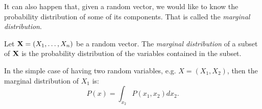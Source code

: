 It can also happen that, given a random vector, we would like to know the probability distribution of some of its components. That is called the \emph{marginal distribution}.

\begin{ndef}
Let $\mathbf{X} = (X_1,\dots,X_n)$ be a random vector. The \emph{marginal distribution} of a subset of $\mathbf{X}$ is the probability distribution of the variables contained in the subset. 
\end{ndef}
In the simple case of having two random variables, e.g. $X= (X_1, X_2)$, then the marginal distribution of $X_1$ is:
$$
P(x) = \int_{x_2} P(x_1,x_2) dx_2.
$$


